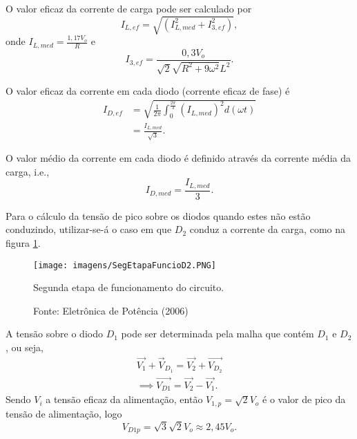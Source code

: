 O valor eficaz da corrente de carga pode ser calculado por \[
I_{L,ef} = \sqrt{(I_{L,med}^2 + I_{3,ef}^2)}
,\] onde $I_{L,med} = \frac{1,17 V_o}{R}$ e \[
I_{3,ef} = \frac{0,3 V_o}{\sqrt{2}{\sqrt{R^2 + 9\omega^2}{L^2}}}
.\] 
 
O valor eficaz da corrente em cada diodo (corrente eficaz de fase) é
\begin{align*}
I_{D,ef} &= \sqrt{\frac{1}{2\pi}{\int_{0}^{\frac{2\pi}{3}}}{(I_{L,med})^2}{d(\omega{t})}} \\
&= \frac{I_{L,med}}{\sqrt{3}}
.\end{align*}

O valor médio da corrente em cada diodo é definido através da corrente média da carga, i.e., \[
    I_{D,med} = \frac{I_{L,med}}{3}
.\]

Para o cálculo da tensão de pico sobre os diodos quando estes não estão conduzindo, utilizar-se-á o caso em que $D_2$ conduz a corrente da carga, como na figura \ref{fig:SEFCD}.

\begin{figure}[ht]
    \center
    \texttt{[image: imagens/SegEtapaFuncioD2.PNG]}
    \caption{Segunda etapa de funcionamento do circuito.}\label{fig:SEFCD}
    \caption*{Fonte: Eletrônica de Potência (2006)}
\end{figure}

A tensão sobre o diodo $D_1$ pode ser determinada pela malha que contém $D_1$ e $D_2$, ou seja,
\begin{align*}
    \vec{V_1} + \vec{V}_{D_1} = \vec{V_2} + \vec{V_{D_2}} \\
    \implies \vec{V_{D1}} = \vec{V_2} - \vec{V_1}
.\end{align*}
Sendo $V_i$ a tensão eficaz da alimentação, então $V_{1,p} = \sqrt{2}{V_o}$ é o valor de pico da tensão de alimentação, logo \[
V_{D1p} = \sqrt{3}\sqrt{2}{V_o} \approx 2,45 V_o
.\] 


